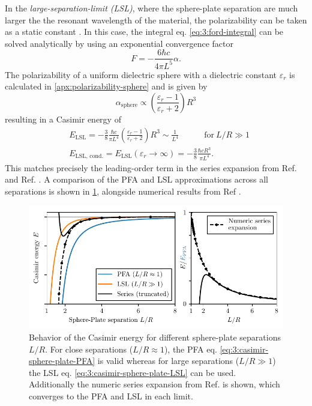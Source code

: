 In the \emph{large-separation-limit (LSL)}, where the sphere-plate separation are much larger the the resonant wavelength of the material, the polarizability can be taken as a static constant \cite{Ford_1998,Kamp_2020}.
In this case, the integral eq. \eqref{eq:3:ford-integral} can be solved analytically by using an exponential convergence factor
\begin{equation}
  F = -\frac{6 \hbar c}{4 \pi L^5} \alpha .
\end{equation}
The polarizability of a uniform dielectric sphere with a dielectric constant $\varepsilon_r$ is calculated in \cref{apx:polarizability-sphere} and is given by
\begin{equation}\label{eq:3:polarizability-sphere}
  \alpha_\mathrm{sphere} \propto \left(\frac{\varepsilon_r - 1}{\varepsilon_r + 2}\right) R^3
\end{equation}
resulting in a Casimir energy of
\begin{align}\label{eq:3:casimir-sphere-plate-LSL}
  &E_\mathrm{LSL} = -\frac{3}{8} \frac{\hbar c}{\pi L^4} \left(\frac{\varepsilon_r - 1}{\varepsilon_r + 2}\right)R^3 \sim \frac{1}{L^4} \quad\quad\quad \text{for}\ L/R \gg 1 \\ \label{eq:3:casimir-sphere-plate-LSL-conducting}
  &E_\mathrm{LSL,\,cond.} = E_\mathrm{LSL}(\varepsilon_r \rightarrow \infty) = -\frac{3}{8} \frac{\hbar c R^3}{\pi L^4} .
\end{align}
This matches precisely the leading-order term in the series expansion from Ref. \cite{Emig_2007a} and Ref. \cite{Pirozhenko_2013}.
A comparison of the PFA and LSL approximations across all separations is shown in \cref{fig:3:casimir-behavior}, alongside numerical results from Ref \cite{Emig_2007a}.
\begin{figure}[!ht]
  \centering
  \includegraphics[width=\textwidth]{./../figures/casimir/casimir-behavior.pdf}
  \caption{Behavior of the Casimir energy for different sphere-plate separations $L/R$. For close separations ($L/R \approx 1$), the PFA eq. \eqref{eq:3:casimir-sphere-plate-PFA} is valid whereas for large separations ($L/R \gg 1$) the LSL eq. \eqref{eq:3:casimir-sphere-plate-LSL} can be used. Additionally the numeric series expansion from Ref. \cite{Emig_2007a} is shown, which converges to the PFA and LSL in each limit.}
  \label{fig:3:casimir-behavior}
\end{figure}

